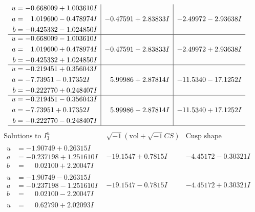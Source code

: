 \documentclass[1p]{elsarticle_modified}
\theoremstyle{definition}
\newcommand{\I}{\sqrt{-1}}
\begin{document}
$$\begin{array}{c|c|c}
\begin{aligned}
u &= -0.668009 + 1.003610 I \\
a &= \phantom{-}1.019600 - 0.478974 I \\
b &= -0.425332 - 1.024850 I\end{aligned}
 & -0.47591 + 2.83833 I & -2.49972 - 2.93638 I \\ \hline\begin{aligned}
u &= -0.668009 - 1.003610 I \\
a &= \phantom{-}1.019600 + 0.478974 I \\
b &= -0.425332 + 1.024850 I\end{aligned}
 & -0.47591 - 2.83833 I & -2.49972 + 2.93638 I \\ \hline\begin{aligned}
u &= -0.219451 + 0.356043 I \\
a &= -7.73951 - 0.17352 I \\
b &= -0.222770 + 0.248407 I\end{aligned}
 & \phantom{-}5.99986 + 2.87814 I & -11.5340 - 17.1252 I \\ \hline\begin{aligned}
u &= -0.219451 - 0.356043 I \\
a &= -7.73951 + 0.17352 I \\
b &= -0.222770 - 0.248407 I\end{aligned}
 & \phantom{-}5.99986 - 2.87814 I & -11.5340 + 17.1252 I\\
 \hline 
 \end{array}$$\newpage$$\begin{array}{c|c|c}  
\text{Solutions to }I^u_{3}& \I (\text{vol} + \sqrt{-1}CS) & \text{Cusp shape}\\
 \hline 
\begin{aligned}
u &= -1.90749 + 0.26315 I \\
a &= -0.237198 + 1.251610 I \\
b &= \phantom{-}0.02100 + 2.20047 I\end{aligned}
 & -19.1547 + 0.7815 I & -4.45172 - 0.30321 I \\ \hline\begin{aligned}
u &= -1.90749 - 0.26315 I \\
a &= -0.237198 - 1.251610 I \\
b &= \phantom{-}0.02100 - 2.20047 I\end{aligned}
 & -19.1547 - 0.7815 I & -4.45172 + 0.30321 I \\ \hline\begin{aligned}
u &= \phantom{-}0.62790 + 2.02093 I \\

\end{aligned}
\end{array}$$
\end{document}
